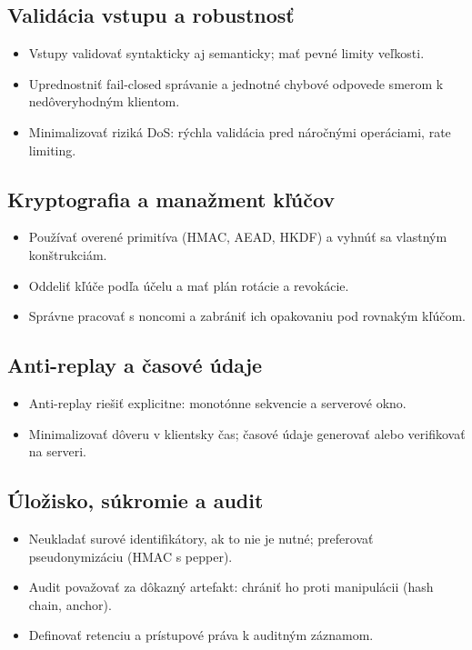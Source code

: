 \documentclass[journal,a4paper,onecolumn]{IEEEtran}
\begin{document}
\subsection{Validácia vstupu a robustnosť}

\begin{itemize}[leftmargin=*,itemsep=2pt]
  \item Vstupy validovať syntakticky aj semanticky; mať pevné limity veľkosti.
  \item Uprednostniť fail-closed správanie a jednotné chybové odpovede smerom k nedôveryhodným klientom.
  \item Minimalizovať riziká DoS: rýchla validácia pred náročnými operáciami, rate limiting.
\end{itemize}

\subsection{Kryptografia a manažment kľúčov}

\begin{itemize}[leftmargin=*,itemsep=2pt]
  \item Používať overené primitíva (HMAC, AEAD, HKDF) a vyhnúť sa vlastným konštrukciám.
  \item Oddeliť kľúče podľa účelu a mať plán rotácie a revokácie.
  \item Správne pracovať s noncomi a zabrániť ich opakovaniu pod rovnakým kľúčom.
\end{itemize}

\subsection{Anti-replay a časové údaje}

\begin{itemize}[leftmargin=*,itemsep=2pt]
  \item Anti-replay riešiť explicitne: monotónne sekvencie a serverové okno.
  \item Minimalizovať dôveru v klientsky čas; časové údaje generovať alebo verifikovať na serveri.
\end{itemize}

\subsection{Úložisko, súkromie a audit}

\begin{itemize}[leftmargin=*,itemsep=2pt]
  \item Neukladať surové identifikátory, ak to nie je nutné; preferovať pseudonymizáciu (HMAC s pepper).
  \item Audit považovať za dôkazný artefakt: chrániť ho proti manipulácii (hash chain, anchor).
  \item Definovať retenciu a prístupové práva k auditným záznamom.
\end{itemize}
\end{document}
